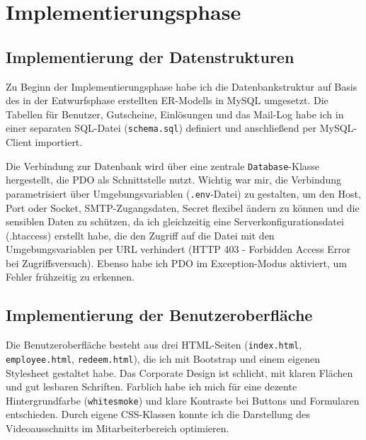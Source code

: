 \section{Implementierungsphase} 
\label{sec:Implementierungsphase}

\subsection{Implementierung der Datenstrukturen}
\label{sec:ImplementierungDatenstrukturen}

Zu Beginn der Implementierungsphase habe ich die Datenbankstruktur auf Basis des in der Entwurfsphase erstellten ER-Modells in MySQL umgesetzt.
Die Tabellen für Benutzer, Gutscheine, Einlösungen und das Mail-Log habe ich in einer separaten SQL-Datei (\texttt{schema.sql}) definiert und anschließend per MySQL-Client importiert.



Die Verbindung zur Datenbank wird über eine zentrale \texttt{Database}-Klasse hergestellt, die \acs{PDO} als Schnittstelle nutzt.
Wichtig war mir, die Verbindung parametrisiert über Umgebungsvariablen (\texttt{.env}-Datei) zu gestalten, um den Host, Port oder Socket, SMTP-Zugangsdaten, Secret \usw flexibel ändern zu können und die sensiblen Daten zu schützen, da ich gleichzeitig eine Serverkonfigurationsdatei (.htaccess) erstellt habe, die den Zugriff auf die Datei mit den Umgebungsvariablen per URL verhindert (HTTP 403 - Forbidden Access Error bei Zugriffsversuch).
Ebenso habe ich \acs{PDO} im Exception-Modus aktiviert, um Fehler frühzeitig zu erkennen.



\subsection{Implementierung der Benutzeroberfläche}
\label{sec:ImplementierungBenutzeroberflaeche}

Die Benutzeroberfläche besteht aus drei HTML-Seiten (\texttt{index.html}, \texttt{employee.html}, \texttt{redeem.html}),
die ich mit Bootstrap und einem eigenen Stylesheet gestaltet habe.
Das Corporate Design ist schlicht, mit klaren Flächen und gut lesbaren Schriften.
Farblich habe ich mich für eine dezente Hintergrundfarbe (\texttt{whitesmoke}) und klare Kontraste bei Buttons und Formularen entschieden.
Durch eigene CSS-Klassen konnte ich \zB die Darstellung des Videoausschnitts im Mitarbeiterbereich optimieren.

